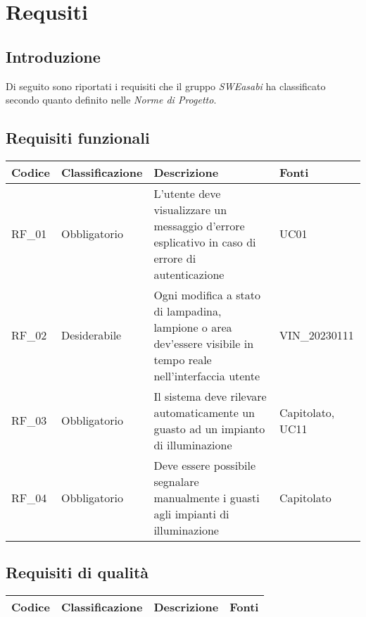 \chapter{Requsiti}

\section{Introduzione}
Di seguito sono riportati i requisiti che il gruppo \textit{SWEasabi} ha classificato secondo quanto definito nelle \textit{Norme di Progetto}.

\section{Requisiti funzionali}

\begin{center}
    \begin{xltabular}{\linewidth}{|l|l|X|l|}
        \hline
        \textbf{Codice} & \textbf{Classificazione} & \textbf{Descrizione} & \textbf{Fonti} \\
        \hline
        RF\_01 & Obbligatorio & L'utente deve visualizzare un messaggio d'errore esplicativo in caso di errore di autenticazione & UC01 \\
        \hline
        RF\_02 & Desiderabile & Ogni modifica a stato di lampadina, lampione o area dev'essere visibile in tempo reale nell'interfaccia utente & VIN\_20230111\\
        \hline
        RF\_03 & Obbligatorio & Il sistema deve rilevare automaticamente un guasto ad un impianto di illuminazione & Capitolato, UC11 \\
        \hline
        RF\_04 & Obbligatorio & Deve essere possibile segnalare manualmente i guasti agli impianti di illuminazione & Capitolato \\
        \hline
    \end{xltabular}
\end{center}


\section{Requisiti di qualità}

\begin{center}
    \begin{xltabular}{\linewidth}{|l|l|X|l|}
    \hline
    \textbf{Codice} & \textbf{Classificazione} & \textbf{Descrizione} & \textbf{Fonti} \\
    \hline

    \end{xltabular}

\end{center}

